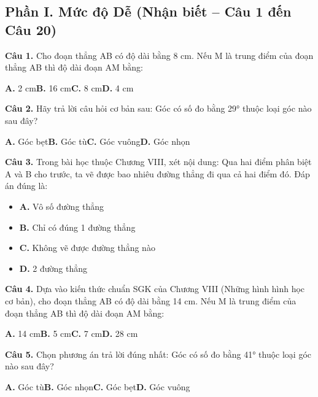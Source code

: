 \documentclass[11pt,a4paper]{article}
\begin{document}
\subsection*{\color{accent} Phần I. Mức độ Dễ (Nhận biết -- Câu 1 đến Câu 20)}
\textbf{\color{primary} Câu 1.} Cho đoạn thẳng AB có độ dài bằng 8 cm. Nếu M là trung điểm của đoạn thẳng AB thì độ dài đoạn AM bằng:\par
\hspace*{1.5em}\textbf{A.} 2 cm\quad\quad \textbf{B.} 16 cm\quad\quad \textbf{C.} 8 cm\quad\quad \textbf{D.} 4 cm\par\vspace{2pt}
\textbf{\color{primary} Câu 2.} Hãy trả lời câu hỏi cơ bản sau: Góc có số đo bằng 29° thuộc loại góc nào sau đây?\par
\hspace*{1.5em}\textbf{A.} Góc bẹt\quad\quad \textbf{B.} Góc tù\quad\quad \textbf{C.} Góc vuông\quad\quad \textbf{D.} Góc nhọn\par\vspace{2pt}
\textbf{\color{primary} Câu 3.} Trong bài học thuộc Chương VIII, xét nội dung: Qua hai điểm phân biệt A và B cho trước, ta vẽ được bao nhiêu đường thẳng đi qua cả hai điểm đó. Đáp án đúng là:\par
\begin{itemize}\setlength{\itemsep}{1pt}\setlength{\parskip}{0pt}
  \item[] \textbf{A.} Vô số đường thẳng
  \item[] \textbf{B.} Chỉ có đúng 1 đường thẳng
  \item[] \textbf{C.} Không vẽ được đường thẳng nào
  \item[] \textbf{D.} 2 đường thẳng
\end{itemize}\vspace{2pt}
\textbf{\color{primary} Câu 4.} Dựa vào kiến thức chuẩn SGK của Chương VIII (Những hình hình học cơ bản), cho đoạn thẳng AB có độ dài bằng 14 cm. Nếu M là trung điểm của đoạn thẳng AB thì độ dài đoạn AM bằng:\par
\hspace*{1.5em}\textbf{A.} 14 cm\quad\quad \textbf{B.} 5 cm\quad\quad \textbf{C.} 7 cm\quad\quad \textbf{D.} 28 cm\par\vspace{2pt}
\textbf{\color{primary} Câu 5.} Chọn phương án trả lời đúng nhất: Góc có số đo bằng 41° thuộc loại góc nào sau đây?\par
\hspace*{1.5em}\textbf{A.} Góc tù\quad\quad \textbf{B.} Góc nhọn\quad\quad \textbf{C.} Góc bẹt\quad\quad \textbf{D.} Góc vuông\par\vspace{2pt}
\end{document}
